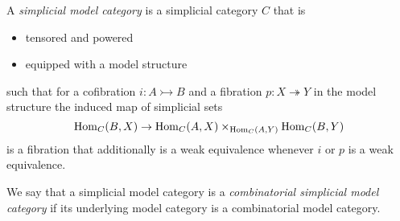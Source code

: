 \begin{definition}
    A \emph{simplicial model category} is a simplicial category $C$ that is 
    \begin{itemize}
        \item tensored and powered
        \item equipped with a model structure
    \end{itemize} 
    such that for a cofibration $i:A\rightarrowtail B$ and a fibration $p:X\twoheadrightarrow Y$ in the model structure the induced map of simplicial sets
    \begin{equation*}
        \operatorname{Hom}_C(B,X)\to\operatorname{Hom}_C(A,X)\times_{\operatorname{Hom}_C(A,Y)}\operatorname{Hom}_C(B,Y)
    \end{equation*}
    is a fibration that additionally is a weak equivalence whenever $i$ or $p$ is a weak equivalence.
    
    We say that a simplicial model category is a \emph{combinatorial simplicial model category} if its underlying model category is a combinatorial model category.
\end{definition}
